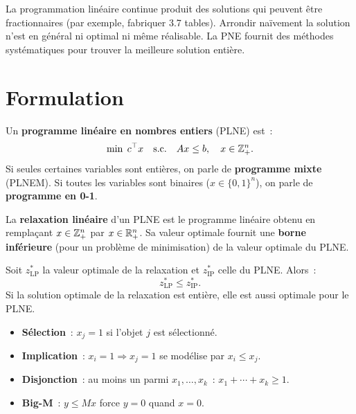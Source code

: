 \begin{intuition}
La programmation lin\'eaire continue produit des solutions qui peuvent \^etre
fractionnaires (par exemple, fabriquer 3.7 tables). Arrondir na\"ivement la
solution n'est en g\'en\'eral ni optimal ni m\^eme r\'ealisable. La PNE
fournit des m\'ethodes syst\'ematiques pour trouver la meilleure solution
enti\`ere.
\end{intuition}

\section{Formulation}

\begin{definition}
Un \textbf{programme lin\'eaire en nombres entiers} (PLNE) est~:
\[
  \min\; c^\top x \quad \text{s.c.} \quad Ax \leq b, \quad x \in \mathbb{Z}^n_+.
\]
Si seules certaines variables sont enti\`eres, on parle de \textbf{programme
mixte} (PLNEM). Si toutes les variables sont binaires ($x \in \{0,1\}^n$), on
parle de \textbf{programme en 0-1}.
\end{definition}

\begin{definition}
La \textbf{relaxation lin\'eaire} d'un PLNE est le programme lin\'eaire obtenu
en rempla\c{c}ant $x \in \mathbb{Z}^n_+$ par $x \in \mathbb{R}^n_+$. Sa valeur optimale
fournit une \textbf{borne inf\'erieure} (pour un probl\`eme de minimisation)
de la valeur optimale du PLNE.
\end{definition}

\begin{proposition}
Soit $z^*_{\mathrm{LP}}$ la valeur optimale de la relaxation et
$z^*_{\mathrm{IP}}$ celle du PLNE. Alors~:
\[
  z^*_{\mathrm{LP}} \leq z^*_{\mathrm{IP}}.
\]
Si la solution optimale de la relaxation est enti\`ere, elle est aussi optimale
pour le PLNE.
\end{proposition}

\begin{formules}[title=\textbf{Mod\'elisation classique en 0-1}]
\begin{itemize}
  \item \textbf{S\'election}~: $x_j = 1$ si l'objet $j$ est s\'electionn\'e.
  \item \textbf{Implication}~: $x_i = 1 \Rightarrow x_j = 1$ se mod\'elise
        par $x_i \leq x_j$.
  \item \textbf{Disjonction}~: au moins un parmi $x_1, \ldots, x_k$~:
        $x_1 + \cdots + x_k \geq 1$.
  \item \textbf{Big-M}~: $y \leq M x$ force $y = 0$ quand $x = 0$.
\end{itemize}
\end{formules}

